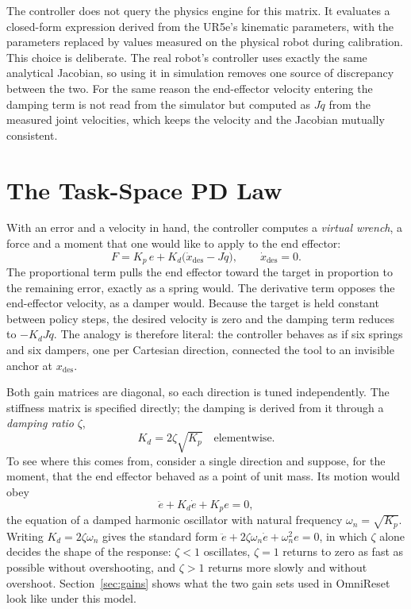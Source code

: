 \documentclass{article}
\newcommand{\des}{\mathrm{des}}
\newcommand{\Kp}{K_p}
\newcommand{\Kd}{K_d}
\begin{document}
The controller does not query the physics engine for this matrix. It evaluates a closed-form expression derived from the UR5e's kinematic parameters, with the parameters replaced by values measured on the physical robot during calibration. This choice is deliberate. The real robot's controller uses exactly the same analytical Jacobian, so using it in simulation removes one source of discrepancy between the two. For the same reason the end-effector velocity entering the damping term is not read from the simulator but computed as $J\dot q$ from the measured joint velocities, which keeps the velocity and the Jacobian mutually consistent.

\section{The Task-Space PD Law}
\label{sec:pd}

With an error and a velocity in hand, the controller computes a \emph{virtual wrench}, a force and a moment that one would like to apply to the end effector:
\begin{equation}
  F = \Kp\,e + \Kd\big(\dot x_\des - J\dot q\big), \qquad \dot x_\des = 0.
  \label{eq:pd}
\end{equation}
The proportional term pulls the end effector toward the target in proportion to the remaining error, exactly as a spring would. The derivative term opposes the end-effector velocity, as a damper would. Because the target is held constant between policy steps, the desired velocity is zero and the damping term reduces to $-\Kd J\dot q$. The analogy is therefore literal: the controller behaves as if six springs and six dampers, one per Cartesian direction, connected the tool to an invisible anchor at $x_\des$.

Both gain matrices are diagonal, so each direction is tuned independently. The stiffness matrix is specified directly; the damping is derived from it through a \emph{damping ratio} $\zeta$,
\begin{equation}
  \Kd = 2\zeta\sqrt{\Kp}\quad\text{elementwise}.
  \label{eq:kd}
\end{equation}
To see where this comes from, consider a single direction and suppose, for the moment, that the end effector behaved as a point of unit mass. Its motion would obey
\begin{equation}
  \ddot e + \Kd\dot e + \Kp e = 0,
\end{equation}
the equation of a damped harmonic oscillator with natural frequency $\omega_n=\sqrt{\Kp}$. Writing $\Kd=2\zeta\omega_n$ gives the standard form $\ddot e+2\zeta\omega_n\dot e+\omega_n^2 e=0$, in which $\zeta$ alone decides the shape of the response: $\zeta<1$ oscillates, $\zeta=1$ returns to zero as fast as possible without overshooting, and $\zeta>1$ returns more slowly and without overshoot. Section~\ref{sec:gains} shows what the two gain sets used in OmniReset look like under this model.
\end{document}
